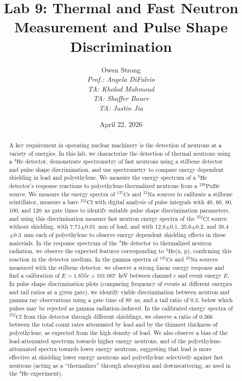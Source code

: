 \documentclass[12pt]{article}
\title{Lab 9: Thermal and Fast Neutron Measurement and Pulse Shape Discrimination}
\author{Owen Strong \\
\itshape Prof.: Angela DiFulvio\\
\itshape TA: Kholod Mahmoud \\
\itshape TA: Shaffer Bauer \\
\itshape TA: Justin Jia \\
}
\date{April 22, 2026}
\newcommand{\CsSrc}{$\mathrm{^{137}Cs}$\xspace}
\newcommand{\NaSrc}{$\mathrm{^{22}Na}$\xspace}
\newcommand{\PuBe}{$\mathrm{^{239}PuBe}$\xspace}
\newcommand{\CfSrc}{$\mathrm{^{252}Cf}$\xspace}
\newcommand{\HeThree}{$\mathrm{^3He}$\xspace}
\begin{document}
\maketitle
\pagebreak
{\hypersetup{linkcolor=black}\tableofcontents}
\pagebreak
{}
\begin{abstract}
A key requirement in operating nuclear machinery is the detection of neutrons at a variety of energies.
In this lab, we characterize the detection of thermal neutrons using a \HeThree detector, demonstrate spectrometry of fast neutrons using a stilbene detector and pulse shape discrimination, and use spectrometry to compare energy dependent shielding in lead and polyethylene.
We measure the energy spectrum of a \HeThree detector's response reactions to polyethylene-thermalized neutrons from a \PuBe source.
We measure the energy spectra of \CsSrc and \NaSrc sources to calibrate a stilbene scintillator, measure a bare \CfSrc with digital analysis of pulse integrals with 40, 60, 80, 100, and 120~ns gate times to identify suitable pulse shape discrimination parameters, and using this discrimination measure fast neutron energy spectra of the \CfSrc source without shielding, with 7.71$\pm$0.01~mm of lead, and with 12.8$\pm$0.1, 25.6$\pm$0.2, and 38.4$\pm$0.3~mm each of polyethylene to observe energy dependent shielding effects in these materials.
In the response spectrum of the \HeThree detector to thermalized neutron radiation, we observe the expected features corresponding to \HeThree(n, p), confirming this reaction in the detector medium.
In the gamma spectra of \CsSrc and \NaSrc sources measured with the stilbene detector, we observe a strong linear energy response and find a calibration of $E=1.855c + 101.067$~keV between channel $c$ and event energy $E$.
In pulse shape discrimination plots (comparing frequency of events at different energies and tail ratios at a given gate), we identify viable discrimination between neutron and gamma ray observations using a gate time of 80~ns, and a tail ratio of 0.3, below which pulses may be rejected as gamma radiation-induced.
In the calibrated energy spectra of \CfSrc from this detector through different shieldings, we observe a ratio of 0.366 between the total count rates attenuated by lead and by the thinnest thickness of polyethylene, as expected from the high density of lead. We also observe a bias of the lead-attenuated spectrum towards higher energy neutrons, and of the polyethylene-attenuated spectra towards lower energy neutrons, suggesting that lead is more effective at shielding lower energy neutrons and polyethylene selectively against fast neutrons (acting as a ``thermalizer'' through absorption and downscattering, as used in the \HeThree experiment).

\end{abstract}
\end{document}
